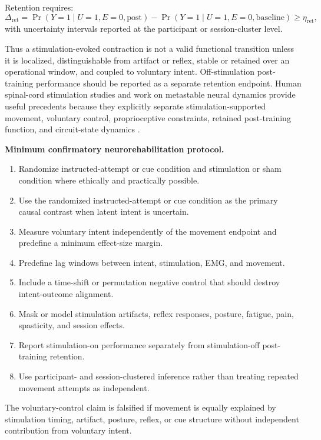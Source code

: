 \documentclass[11pt,a4paper]{article}
\newcommand{\1}{\mathbf{1}}
\begin{document}
Retention requires:
\[
  \Delta_{\mathrm{ret}}=
  \Pr(Y=1\mid U=1,E=0,\mathrm{post})
  -
  \Pr(Y=1\mid U=1,E=0,\mathrm{baseline})
  \geq \eta_{\mathrm{ret}},
\]
with uncertainty intervals reported at the participant or session-cluster level.

Thus a stimulation-evoked contraction is not a valid functional transition unless it is localized, distinguishable from artifact or reflex, stable or retained over an operational window, and coupled to voluntary intent. Off-stimulation post-training performance should be reported as a separate retention endpoint. Human spinal-cord stimulation studies and work on metastable neural dynamics provide useful precedents because they explicitly separate stimulation-supported movement, voluntary control, proprioceptive constraints, retained post-training function, and circuit-state dynamics \cite{brinkman2022,wagner2018,formento2018}.

\noindent\textbf{Minimum confirmatory neurorehabilitation protocol.}
\begin{enumerate}
  \item Randomize instructed-attempt or cue condition and stimulation or sham condition where ethically and practically possible.
  \item Use the randomized instructed-attempt or cue condition as the primary causal contrast when latent intent is uncertain.
  \item Measure voluntary intent independently of the movement endpoint and predefine a minimum effect-size margin.
  \item Predefine lag windows between intent, stimulation, EMG, and movement.
  \item Include a time-shift or permutation negative control that should destroy intent-outcome alignment.
  \item Mask or model stimulation artifacts, reflex responses, posture, fatigue, pain, spasticity, and session effects.
  \item Report stimulation-on performance separately from stimulation-off post-training retention.
  \item Use participant- and session-clustered inference rather than treating repeated movement attempts as independent.
\end{enumerate}

The voluntary-control claim is falsified if movement is equally explained by stimulation timing, artifact, posture, reflex, or cue structure without independent contribution from voluntary intent.
\end{document}
